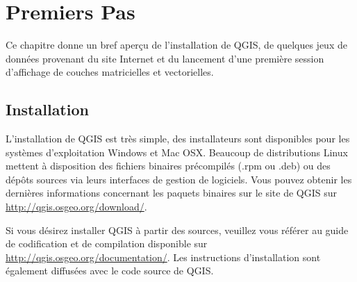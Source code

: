 
\section{Premiers Pas}\label{label_getstarted}



Ce chapitre donne un bref aperçu de l'installation de QGIS, de quelques jeux de données provenant du site Internet et du lancement d'une première session d'affichage de couches matricielles et vectorielles.

\subsection{Installation}\label{label_installation}


L'installation de QGIS est très simple, des installateurs sont disponibles pour les systèmes d'exploitation Windows et Mac OSX. Beaucoup de distributions Linux mettent à disposition des fichiers binaires précompilés (.rpm ou .deb) ou des dépôts sources via leurs interfaces de gestion de logiciels. Vous pouvez obtenir les dernières informations concernant les paquets binaires sur le site de QGIS sur \url{http://qgis.osgeo.org/download/}.




Si vous désirez installer QGIS à  partir des sources, veuillez vous référer au guide de codification et de compilation disponible sur \url{http://qgis.osgeo.org/documentation/}.
Les instructions d'installation sont également diffusées avec le code source de QGIS.

